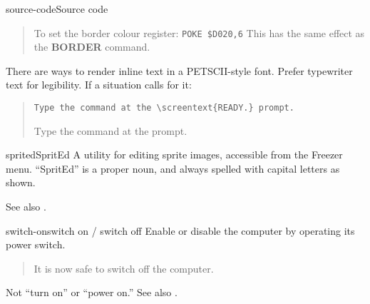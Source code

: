 \begin{sgentry}{source-code}{Source code}
\begin{quote}
        \hrulefill

        To set the border colour register: \texttt{POKE \$D020,6} This has the same effect as the \textbf{BORDER} command.
    \end{quote}

    There are ways to render inline text in a PETSCII-style font. Prefer typewriter text for legibility. If a situation calls for it:

    \begin{quote}
        \texttt{Type the command at the {\textbackslash}screentext\{READY.\} prompt.}

        \hrulefill

        Type the command at the  prompt.
    \end{quote}
\end{sgentry}

\begin{sgentry}{sprited}{SpritEd}
    A utility for editing sprite images, accessible from the Freezer menu. ``SpritEd'' is a proper noun, and always spelled with capital letters as shown.

    See also .
\end{sgentry}

\begin{sgentry}{switch-on}{switch on / switch off}
    Enable or disable the computer by operating its power switch.

    \begin{quote}
        It is now safe to switch off the computer.
    \end{quote}

    Not ``turn on'' or ``power on.'' See also .
\end{sgentry}

